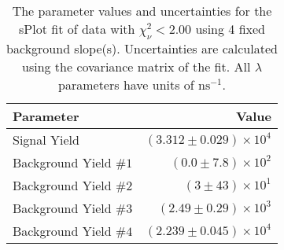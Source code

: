 
\begin{table}
    \begin{center}
        \begin{tabular}{lr}\toprule
            Parameter & Value \\\midrule
            Signal Yield & $(3.312 \pm 0.029) \times 10^{4}$ \\
            Background Yield $\#1$ & $(0.0 \pm 7.8) \times 10^{2}$ \\
            Background Yield $\#2$ & $(3 \pm 43) \times 10^{1}$ \\
            Background Yield $\#3$ & $(2.49 \pm 0.29) \times 10^{3}$ \\
            Background Yield $\#4$ & $(2.239 \pm 0.045) \times 10^{4}$ \\\bottomrule
        \end{tabular}
        \caption{The parameter values and uncertainties for the sPlot fit of data with $\chi^2_\nu < 2.00$ using 4 fixed background slope(s). Uncertainties are calculated using the covariance matrix of the fit. All $\lambda$ parameters have units of $\si{\nano\second}^{-1}$.}
    \end{center}
\end{table}

